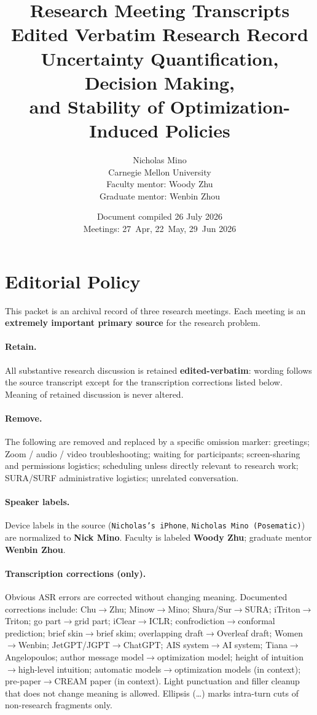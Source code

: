 \documentclass[11pt]{article}
\title{Research Meeting Transcripts\\[0.35em]
\large Edited Verbatim Research Record\\[0.15em]
\normalsize Uncertainty Quantification, Decision Making,\\
and Stability of Optimization-Induced Policies}
\author{Nicholas Mino\\
Carnegie Mellon University\\[0.4em]
\small Faculty mentor: Woody Zhu\\
\small Graduate mentor: Wenbin Zhou}
\date{Document compiled 26 July 2026\\
\small Meetings: 27~Apr, 22~May, 29~Jun 2026}
\begin{document}
\maketitle

\section*{Editorial Policy}
This packet is an archival record of three research meetings. Each meeting is an
\textbf{extremely important primary source} for the research problem.

\paragraph{Retain.}
All substantive research discussion is retained \textbf{edited-verbatim}: wording
follows the source transcript except for the transcription corrections listed
below. Meaning of retained discussion is never altered.

\paragraph{Remove.}
The following are removed and replaced by a specific omission marker:
greetings; Zoom / audio / video troubleshooting; waiting for participants;
screen-sharing and permissions logistics; scheduling unless directly relevant
to research work; SURA/SURF administrative logistics; unrelated conversation.

\paragraph{Speaker labels.}
Device labels in the source (\texttt{Nicholas's iPhone},
\texttt{Nicholas Mino (Posematic)}) are normalized to \textbf{Nick Mino}.
Faculty is labeled \textbf{Woody Zhu}; graduate mentor \textbf{Wenbin Zhou}.

\paragraph{Transcription corrections (only).}
Obvious ASR errors are corrected without changing meaning. Documented
corrections include: Chu$\to$Zhu; Minow$\to$Mino; Shura/Sur$\to$SURA;
iTriton$\to$Triton; go part$\to$grid part; iClear$\to$ICLR;
confrodiction$\to$conformal prediction; brief skin$\to$brief skim;
overlapping draft$\to$Overleaf draft; Women$\to$Wenbin; JetGPT/JGPT$\to$ChatGPT; AIS system$\to$AI system;
Tiana$\to$Angelopoulos; author message model$\to$optimization model;
height of intuition$\to$high-level intuition;
automatic models$\to$optimization models (in context);
pre-paper$\to$CREAM paper (in context). Light punctuation and
filler cleanup that does not change meaning is allowed. Ellipsis
(\ldots) marks intra-turn cuts of non-research fragments only.
\end{document}
